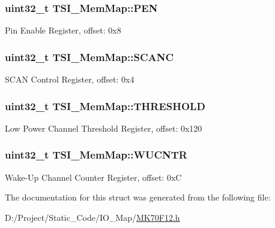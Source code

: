 \subsubsection[{P\+E\+N}]{\setlength{\rightskip}{0pt plus 5cm}uint32\+\_\+t T\+S\+I\+\_\+\+Mem\+Map\+::\+P\+E\+N}\label{struct_t_s_i___mem_map_a37c8a06461ca09948d6a65a1289bccd9}
Pin Enable Register, offset\+: 0x8 \hypertarget{struct_t_s_i___mem_map_abbf29c929817b57dbec256343e066a85}{}
\subsubsection[{S\+C\+A\+N\+C}]{\setlength{\rightskip}{0pt plus 5cm}uint32\+\_\+t T\+S\+I\+\_\+\+Mem\+Map\+::\+S\+C\+A\+N\+C}\label{struct_t_s_i___mem_map_abbf29c929817b57dbec256343e066a85}
S\+C\+A\+N Control Register, offset\+: 0x4 \hypertarget{struct_t_s_i___mem_map_a716863c50b790ef08399633c624ad313}{}
\subsubsection[{T\+H\+R\+E\+S\+H\+O\+L\+D}]{\setlength{\rightskip}{0pt plus 5cm}uint32\+\_\+t T\+S\+I\+\_\+\+Mem\+Map\+::\+T\+H\+R\+E\+S\+H\+O\+L\+D}\label{struct_t_s_i___mem_map_a716863c50b790ef08399633c624ad313}
Low Power Channel Threshold Register, offset\+: 0x120 \hypertarget{struct_t_s_i___mem_map_ae36ce42bd55889c91be08af94a07203e}{}
\subsubsection[{W\+U\+C\+N\+T\+R}]{\setlength{\rightskip}{0pt plus 5cm}uint32\+\_\+t T\+S\+I\+\_\+\+Mem\+Map\+::\+W\+U\+C\+N\+T\+R}\label{struct_t_s_i___mem_map_ae36ce42bd55889c91be08af94a07203e}
Wake-\/\+Up Channel Counter Register, offset\+: 0x\+C 

The documentation for this struct was generated from the following file\+:\begin{DoxyCompactItemize}
\item 
D\+:/\+Project/\+Static\+\_\+\+Code/\+I\+O\+\_\+\+Map/\hyperlink{_m_k70_f12_8h}{M\+K70\+F12.\+h}\end{DoxyCompactItemize}

